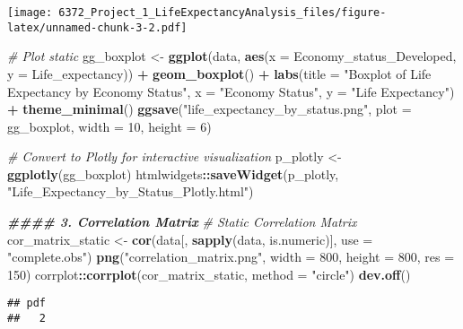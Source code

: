 \documentclass[
]{article}
\newenvironment{Shaded}{\begin{snugshade}}{\end{snugshade}}
\newcommand{\AttributeTok}[1]{\textcolor[rgb]{0.13,0.29,0.53}{#1}}
\newcommand{\CommentTok}[1]{\textcolor[rgb]{0.56,0.35,0.01}{\textit{#1}}}
\newcommand{\DecValTok}[1]{\textcolor[rgb]{0.00,0.00,0.81}{#1}}
\newcommand{\DocumentationTok}[1]{\textcolor[rgb]{0.56,0.35,0.01}{\textbf{\textit{#1}}}}
\newcommand{\FunctionTok}[1]{\textcolor[rgb]{0.13,0.29,0.53}{\textbf{#1}}}
\newcommand{\NormalTok}[1]{#1}
\newcommand{\OtherTok}[1]{\textcolor[rgb]{0.56,0.35,0.01}{#1}}
\newcommand{\SpecialCharTok}[1]{\textcolor[rgb]{0.81,0.36,0.00}{\textbf{#1}}}
\newcommand{\StringTok}[1]{\textcolor[rgb]{0.31,0.60,0.02}{#1}}
\begin{document}
\texttt{[image: 6372\_Project\_1\_LifeExpectancyAnalysis\_files/figure-latex/unnamed-chunk-3-2.pdf]}

\begin{Shaded}
\begin{Highlighting}[]
\CommentTok{\# Plot static}
\NormalTok{gg\_boxplot }\OtherTok{\textless{}{-}} \FunctionTok{ggplot}\NormalTok{(data, }\FunctionTok{aes}\NormalTok{(}\AttributeTok{x =}\NormalTok{ Economy\_status\_Developed, }\AttributeTok{y =}\NormalTok{ Life\_expectancy)) }\SpecialCharTok{+} 
  \FunctionTok{geom\_boxplot}\NormalTok{() }\SpecialCharTok{+}
  \FunctionTok{labs}\NormalTok{(}\AttributeTok{title =} \StringTok{"Boxplot of Life Expectancy by Economy Status"}\NormalTok{,}
       \AttributeTok{x =} \StringTok{"Economy Status"}\NormalTok{, }\AttributeTok{y =} \StringTok{"Life Expectancy"}\NormalTok{) }\SpecialCharTok{+}
  \FunctionTok{theme\_minimal}\NormalTok{()}
\FunctionTok{ggsave}\NormalTok{(}\StringTok{"life\_expectancy\_by\_status.png"}\NormalTok{, }\AttributeTok{plot =}\NormalTok{ gg\_boxplot, }\AttributeTok{width =} \DecValTok{10}\NormalTok{, }\AttributeTok{height =} \DecValTok{6}\NormalTok{)}

\CommentTok{\# Convert to Plotly for interactive visualization}
\NormalTok{p\_plotly }\OtherTok{\textless{}{-}} \FunctionTok{ggplotly}\NormalTok{(gg\_boxplot)}
\NormalTok{htmlwidgets}\SpecialCharTok{::}\FunctionTok{saveWidget}\NormalTok{(p\_plotly, }\StringTok{"Life\_Expectancy\_by\_Status\_Plotly.html"}\NormalTok{)}


\DocumentationTok{\#\#\#\# 3. Correlation Matrix }
\CommentTok{\# Static Correlation Matrix}
\NormalTok{cor\_matrix\_static }\OtherTok{\textless{}{-}} \FunctionTok{cor}\NormalTok{(data[, }\FunctionTok{sapply}\NormalTok{(data, is.numeric)], }\AttributeTok{use =} \StringTok{"complete.obs"}\NormalTok{)}
\FunctionTok{png}\NormalTok{(}\StringTok{"correlation\_matrix.png"}\NormalTok{, }\AttributeTok{width =} \DecValTok{800}\NormalTok{, }\AttributeTok{height =} \DecValTok{800}\NormalTok{, }\AttributeTok{res =} \DecValTok{150}\NormalTok{)}
\NormalTok{corrplot}\SpecialCharTok{::}\FunctionTok{corrplot}\NormalTok{(cor\_matrix\_static, }\AttributeTok{method =} \StringTok{"circle"}\NormalTok{)}
\FunctionTok{dev.off}\NormalTok{()}
\end{Highlighting}
\end{Shaded}

\begin{verbatim}
## pdf 
##   2
\end{verbatim}
\end{document}
